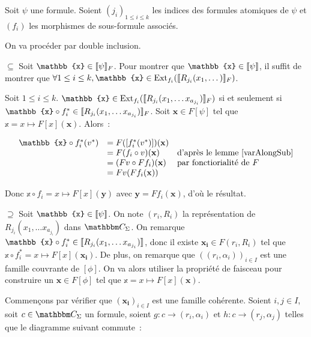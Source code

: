 \begin{pv}
    Soit $\psi$ une formule.
    Soient $(j_i)_{1\leq i\leq k}$ les indices des formules atomiques de $\psi$
    et $(f_i)$ les morphismes de sous-formule associés.

    On va procéder par double inclusion.

    $\boxed{\subseteq}$ Soit $\mathbb{x}\in\sem{\psi}_F$.  Pour montrer que
    $\mathbb{x}\in\sem{\psi}$, il suffit de montrer que $\forall 1\leq i\leq k,
    \mathbb{x}\in\ext_{f_i}(\sem{R_{j_i}(x_1,\dots)}_F)$.

    Soit $1\leq i\leq k$. $\mathbb{x}\in\ext_{f_i}(\sem{R_{j_i}(x_1,\dots
    x_{a_{j_i}})}_F)$ si et seulement si $\mathbb{x}\circ f_i^*\in\sem{R_{j_i}(x_1,\dots
    x_{a_{j_i}})}_F$. Soit $\mathbf{x}\in F[\psi]$ tel que
    $\mathbb{x} = x\mapsto F[x](\mathbf{x})$.
    Alors~:
    
    \[\begin{array}{rll}
        \mathbb{x}\circ f_i^*(v^*) &= F([f_i^*(v^*)])(\mathbf{x}) & \\
         &= F(f_i\circ v)(\mathbf{x})
             & \text{d'après le lemme \ref{varAlongSub}} \\
         &= (Fv\circ Ff_i)(\mathbf{x}) & \text{par fonctiorialité de } F\\
         &= Fv(Ff_i(\mathbf{x})) & \\
    \end{array}\]

    Donc $\mathbb{x}\circ f_i = x\mapsto F[x](\mathbf{y})$ 
    avec $\mathbf{y} = Ff_i(\mathbf{x})$, d'où le résultat.

    $\boxed{\supseteq}$ Soit $\mathbb{x}\in\sem{\psi}$. On note $(r_i,R_i)$ la
    représentation de $R_{j_i}(x_1,\dots x_{a_{j_i}})$ dans $\C_\Sigma$. On
    remarque $\mathbb{x}\circ f_i^*\in\sem{R_{j_i}(x_1,\dots x_{a_{j_i}})}$, donc il existe
    $\mathbf{x_i}\in F(r_i,R_i)$ tel que
    $\mathbb{x}\circ f_i^* = x\mapsto F[x](\mathbf{x_i})$. De plus, on remarque que
    $((r_i,\alpha_i))_{i\in I}$ est une famille couvrante de $[\phi]$. On va alors utiliser
    la propriété de faisceau pour construire un $\mathbf{x}\in F[\phi]$ tel que
    $\mathbb{x} = x\mapsto F[x](\mathbf{x})$.

    Commençons par vérifier que $(\mathbf{x_i})_{i\in I}$ est une famille cohérente. Soient
    $i,j\in I$, soit $c\in\C_\Sigma$ un formule, soient
    $g:c\rightarrow (r_i,\alpha_i)$
    et $h:c\rightarrow (r_j,\alpha_j)$ telles que le diagramme suivant commute~:


\end{pv}
